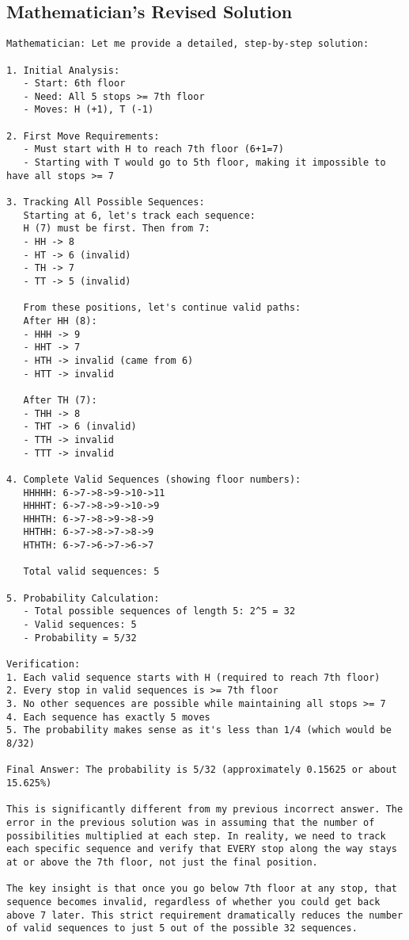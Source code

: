 \subsection{Mathematician's Revised Solution}
\vspace{-0.5em}
\begin{mathematicianbox}
\begin{lstlisting}
Mathematician: Let me provide a detailed, step-by-step solution:

1. Initial Analysis:
   - Start: 6th floor
   - Need: All 5 stops >= 7th floor
   - Moves: H (+1), T (-1)

2. First Move Requirements:
   - Must start with H to reach 7th floor (6+1=7)
   - Starting with T would go to 5th floor, making it impossible to have all stops >= 7

3. Tracking All Possible Sequences:
   Starting at 6, let's track each sequence:
   H (7) must be first. Then from 7:
   - HH -> 8
   - HT -> 6 (invalid)
   - TH -> 7
   - TT -> 5 (invalid)

   From these positions, let's continue valid paths:
   After HH (8):
   - HHH -> 9
   - HHT -> 7
   - HTH -> invalid (came from 6)
   - HTT -> invalid

   After TH (7):
   - THH -> 8
   - THT -> 6 (invalid)
   - TTH -> invalid
   - TTT -> invalid

4. Complete Valid Sequences (showing floor numbers):
   HHHHH: 6->7->8->9->10->11
   HHHHT: 6->7->8->9->10->9
   HHHTH: 6->7->8->9->8->9
   HHTHH: 6->7->8->7->8->9
   HTHTH: 6->7->6->7->6->7

   Total valid sequences: 5

5. Probability Calculation:
   - Total possible sequences of length 5: 2^5 = 32
   - Valid sequences: 5
   - Probability = 5/32

Verification:
1. Each valid sequence starts with H (required to reach 7th floor)
2. Every stop in valid sequences is >= 7th floor
3. No other sequences are possible while maintaining all stops >= 7
4. Each sequence has exactly 5 moves
5. The probability makes sense as it's less than 1/4 (which would be 8/32)

Final Answer: The probability is 5/32 (approximately 0.15625 or about 15.625%)

This is significantly different from my previous incorrect answer. The error in the previous solution was in assuming that the number of possibilities multiplied at each step. In reality, we need to track each specific sequence and verify that EVERY stop along the way stays at or above the 7th floor, not just the final position.

The key insight is that once you go below 7th floor at any stop, that sequence becomes invalid, regardless of whether you could get back above 7 later. This strict requirement dramatically reduces the number of valid sequences to just 5 out of the possible 32 sequences.
\end{lstlisting}
\end{mathematicianbox}

